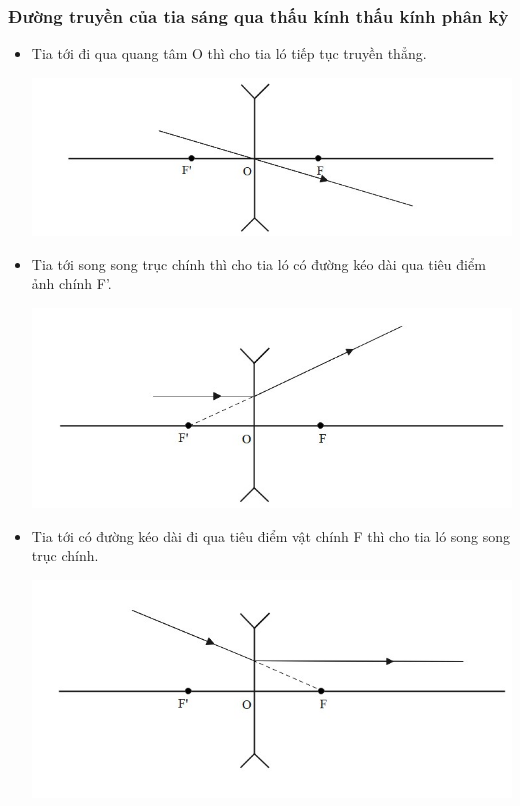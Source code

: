 \subsubsection{ Đường truyền của tia sáng qua thấu  kính thấu kính phân kỳ}
\begin{itemize}
\item Tia tới đi qua quang tâm O thì cho tia ló tiếp tục truyền thẳng.
	\begin{center}
	\includegraphics[scale=0.7]{../figs/VN11-PH-38-L-026-2-h22.jpg}
\end{center}
\item Tia tới song song trục chính thì cho tia ló có đường kéo dài qua tiêu điểm ảnh chính F'.
	\begin{center}
	\includegraphics[scale=0.7]{../figs/VN11-PH-38-L-026-2-h23.jpg}
\end{center}
\item Tia tới có đường kéo dài đi qua tiêu điểm vật chính F thì cho tia ló song song trục chính.
	\begin{center}
	\includegraphics[scale=0.7]{../figs/VN11-PH-38-L-026-2-h24.jpg}
\end{center} 
\end{itemize}
